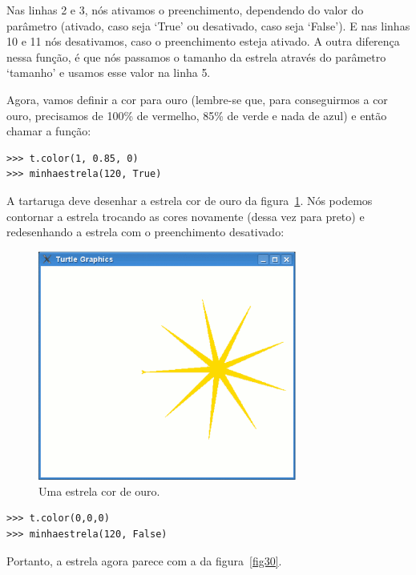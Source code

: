 Nas linhas 2 e 3, nós ativamos o preenchimento, dependendo do valor do parâmetro  (ativado, caso seja `True' ou desativado, caso seja `False'). E nas linhas 10 e 11 nós desativamos, caso o preenchimento esteja ativado. A outra diferença nessa função, é que nós passamos o tamanho da estrela através do parâmetro `tamanho' e usamos esse valor na linha 5.
\par
Agora, vamos definir a cor para ouro (lembre-se que, para conseguirmos a cor ouro, precisamos de 100\% de vermelho, 85\% de verde e nada de azul) e então chamar a função:

\begin{listing}
\begin{verbatim}
>>> t.color(1, 0.85, 0)
>>> minhaestrela(120, True)
\end{verbatim}
\end{listing}

\noindent
A tartaruga deve desenhar a estrela cor de ouro da figura~\ref{fig29}. Nós podemos contornar a estrela trocando as cores novamente (dessa vez para preto) e redesenhando a estrela com o preenchimento desativado:

\begin{figure}
\begin{center}
\includegraphics[width=85mm]{eps/figure29.eps}
\end{center}
\caption{Uma estrela cor de ouro.}\label{fig29}
\end{figure}

\begin{listing}
\begin{verbatim}
>>> t.color(0,0,0)
>>> minhaestrela(120, False)
\end{verbatim}
\end{listing}

\noindent
Portanto, a estrela agora parece com a da figura~\ref{fig30}.

